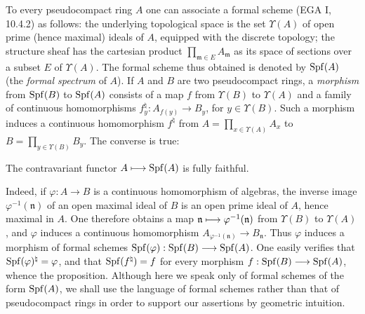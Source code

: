 To every pseudocompact ring $A$ one can associate a formal scheme (EGA I, 10.4.2) as follows: the underlying topological space is the set $\Upsilon(A)$ of open prime (hence maximal) ideals of $A$, equipped with the discrete topology; the structure sheaf has the cartesian product $\prod_{\mathfrak m\in E}A_{\mathfrak m}$ as its space of sections over a subset $E$ of $\Upsilon(A)$. The formal scheme thus obtained is denoted by $\operatorname{Spf}(A)$ (the \emph{formal spectrum} of $A$).
If $A$ and $B$ are two pseudocompact rings, a \emph{morphism} from $\operatorname{Spf}(B)$ to $\operatorname{Spf}(A)$ consists of a map $f$ from $\Upsilon(B)$ to $\Upsilon(A)$ and a family of continuous homomorphisms $f_y^\natural:A_{f(y)}\to B_y$, for $y\in\Upsilon(B)$. Such a morphism induces a continuous homomorphism $f^\natural$ from $A=\prod_{x\in\Upsilon(A)}A_x$ to $B=\prod_{y\in\Upsilon(B)}B_y$. The converse is true:
\begin{proposition}{}
The contravariant functor $A\longmapsto\operatorname{Spf}(A)$ is fully faithful.
\end{proposition}
Indeed, if $\varphi:A\to B$ is a continuous homomorphism of algebras, the inverse image $\varphi^{-1}(\mathfrak n)$ of an open maximal ideal of $B$ is an open prime ideal of $A$, hence maximal in $A$. One therefore obtains a map $\mathfrak n\longmapsto\varphi^{-1}(\mathfrak n)$ from $\Upsilon(B)$ to $\Upsilon(A)$, and $\varphi$ induces a continuous homomorphism $A_{\varphi^{-1}(\mathfrak n)}\to B_{\mathfrak n}$. Thus $\varphi$ induces a morphism of formal schemes $\operatorname{Spf}(\varphi):\operatorname{Spf}(B)\longrightarrow\operatorname{Spf}(A)$. One easily verifies that $\operatorname{Spf}(\varphi)^\natural=\varphi$, and that $\operatorname{Spf}(f^\natural)=f$ for every morphism $f:\operatorname{Spf}(B)\longrightarrow\operatorname{Spf}(A)$, whence the proposition.
Although here we speak only of formal schemes of the form $\operatorname{Spf}(A)$, we shall use the language of formal schemes rather than that of pseudocompact rings in order to support our assertions by geometric intuition.

